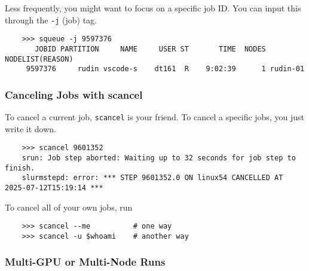   Less frequently, you might want to focus on a specific job ID. You can input this through the \texttt{-j} (job) tag. 

  \begin{lstlisting}
    >>> squeue -j 9597376
       JOBID PARTITION     NAME     USER ST       TIME  NODES NODELIST(REASON)
     9597376     rudin vscode-s    dt161  R    9:02:39      1 rudin-01 
  \end{lstlisting}
  
\subsubsection{Canceling Jobs with scancel}

  To cancel a current job, \texttt{scancel} is your friend. To cancel a specific jobs, you just write it down. 

  \begin{lstlisting}
    >>> scancel 9601352   
    srun: Job step aborted: Waiting up to 32 seconds for job step to finish.
    slurmstepd: error: *** STEP 9601352.0 ON linux54 CANCELLED AT 2025-07-12T15:19:14 ***   
  \end{lstlisting}

  To cancel all of your own jobs, run 
  \begin{lstlisting}
    >>> scancel --me          # one way
    >>> scancel -u $whoami    # another way
  \end{lstlisting} 

\subsubsection{Multi-GPU or Multi-Node Runs}
